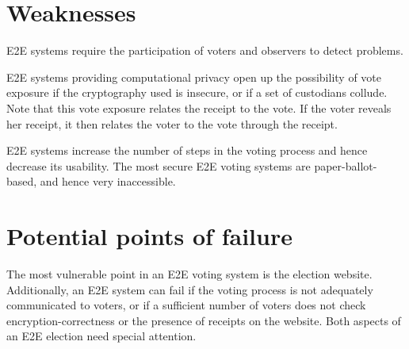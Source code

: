 \section{Weaknesses}

E2E systems require the participation of voters and observers to detect
problems.

E2E systems providing computational privacy open up the possibility of vote
exposure if the cryptography used is insecure, or if a set of custodians
collude. Note that this vote exposure relates the receipt to the vote. If
the voter reveals her receipt, it then relates the voter to the vote through
the receipt.

E2E systems increase the number of steps in the voting process and hence
decrease its usability. The most secure E2E voting systems are
paper-ballot-based, and hence very inaccessible.

\section{Potential points of failure}

The most vulnerable point in an E2E voting system is the election website.
Additionally, an E2E system can fail if the voting process is not adequately
communicated to voters, or if a sufficient number of voters does not check
encryption-correctness or the presence of receipts on the website. Both
aspects of an E2E election need special attention.
